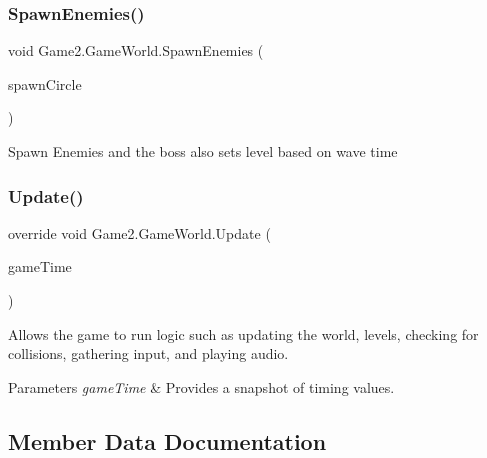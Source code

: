\mbox{\label{class_game2_1_1_game_world_a268f162de7a1df8df00d740342465e41}} 
\subsubsection{\texorpdfstring{Spawn\+Enemies()}{SpawnEnemies()}}
{\footnotesize\ttfamily void Game2.\+Game\+World.\+Spawn\+Enemies (\begin{DoxyParamCaption}\item[{double}]{spawn\+Circle }\end{DoxyParamCaption})}



Spawn Enemies and the boss also sets level based on wave time 

\mbox{\label{class_game2_1_1_game_world_a653a301b00ac7b3fd16260d5c30d8f36}} 
\subsubsection{\texorpdfstring{Update()}{Update()}}
{\footnotesize\ttfamily override void Game2.\+Game\+World.\+Update (\begin{DoxyParamCaption}\item[{Game\+Time}]{game\+Time }\end{DoxyParamCaption})\hspace{0.3cm}{\ttfamily [protected]}}



Allows the game to run logic such as updating the world, levels, checking for collisions, gathering input, and playing audio. 


\begin{DoxyParams}{Parameters}
{\em game\+Time} & Provides a snapshot of timing values.\\
\hline
\end{DoxyParams}


\subsection{Member Data Documentation}
\mbox{\label{class_game2_1_1_game_world_a7c01e067c7488bd5a80b810c5183e3af}} 
